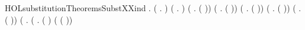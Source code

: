 \begin{SaveVerbatim}{HOLsubstitutionTheoremsSubstXXind}
\HOLTokenTurnstile{} \HOLSymConst{\HOLTokenForall{}}.
     (\HOLSymConst{\HOLTokenForall{}} .    ) \HOLSymConst{\HOLTokenConj{}} (\HOLSymConst{\HOLTokenForall{}} .    ) \HOLSymConst{\HOLTokenConj{}}
     (\HOLSymConst{\HOLTokenForall{}}  .    ( )) \HOLSymConst{\HOLTokenConj{}}
     (\HOLSymConst{\HOLTokenForall{}}   .     \HOLSymConst{\HOLTokenConj{}}     \HOLSymConst{\HOLTokenImp{}}    (  )) \HOLSymConst{\HOLTokenConj{}}
     (\HOLSymConst{\HOLTokenForall{}}   .     \HOLSymConst{\HOLTokenConj{}}     \HOLSymConst{\HOLTokenImp{}}    (  )) \HOLSymConst{\HOLTokenConj{}}
     (\HOLSymConst{\HOLTokenForall{}}   .     \HOLSymConst{\HOLTokenImp{}}    (  )) \HOLSymConst{\HOLTokenConj{}}
     (\HOLSymConst{\HOLTokenForall{}}   .     \HOLSymConst{\HOLTokenImp{}}    (  )) \HOLSymConst{\HOLTokenConj{}}
     (\HOLSymConst{\HOLTokenForall{}}   .
        (\HOLSymConst{\HOLTokenForall{}} .
           ( \HOLSymConst{=}  ) \HOLSymConst{\HOLTokenConj{}} \HOLSymConst{\HOLTokenNeg{}}( \HOLConst{\HOLTokenNotIn{}}  \HOLSymConst{\HOLTokenDisj{}} ( \HOLSymConst{=} )) \HOLSymConst{\HOLTokenConj{}}  \HOLConst{\HOLTokenIn{}}   \HOLSymConst{\HOLTokenConj{}}

\end{SaveVerbatim}

